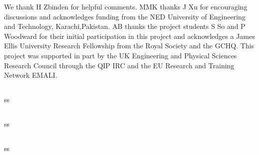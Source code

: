 We thank H Zbinden for helpful comments. MMK thanks J Xu for encouraging discussions and acknowledges funding from the NED University of Engineering and Technology, Karachi,Pakistan. AB thanks the project students S So and P Woodward for their initial participation in this project and acknowledges a James Ellis University Research Fellowship from the Royal Society and the GCHQ. This project was supported in part by the UK Engineering and Physical Sciences Research Council through the QIP IRC and the EU Research and Training Network EMALI.

\subsection{\trnas}
ss
\subsection{\review}
ss
\subsection{\dic}
ss